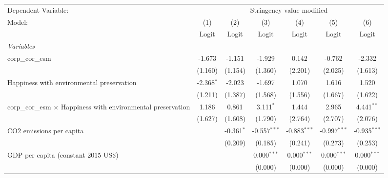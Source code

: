 
\begingroup
\centering
\begin{tabular}{lcccccc}
   \toprule
   Dependent Variable: & \multicolumn{6}{c}{Stringency value modified}\\
   Model:                                                               & (1)          & (2)          & (3)            & (4)            & (5)            & (6)\\  
                                                                        &  Logit       & Logit        & Logit          & Logit          & Logit          & Logit\\  
   \midrule
   \emph{Variables}\\
   corp\_cor\_esm                                                       & -1.673       & -1.151       & -1.929         & 0.142          & -0.762         & -2.332\\   
                                                                        & (1.160)      & (1.154)      & (1.360)        & (2.201)        & (2.025)        & (1.613)\\   
   Happiness with environmental preservation                            & -2.368$^{*}$ & -2.023       & -1.697         & 1.070          & 1.616          & 1.520\\   
                                                                        & (1.211)      & (1.387)      & (1.568)        & (1.556)        & (1.667)        & (1.622)\\   
   corp\_cor\_esm $\times$ Happiness with environmental preservation    & 1.186        & 0.861        & 3.111$^{*}$    & 1.444          & 2.965          & 4.441$^{**}$\\   
                                                                        & (1.627)      & (1.608)      & (1.790)        & (2.764)        & (2.707)        & (2.076)\\   
   CO2 emissions per capita                                             &              & -0.361$^{*}$ & -0.557$^{***}$ & -0.883$^{***}$ & -0.997$^{***}$ & -0.935$^{***}$\\   
                                                                        &              & (0.209)      & (0.185)        & (0.241)        & (0.273)        & (0.253)\\   
   GDP per capita (constant 2015 US\$)                                  &              &              & 0.000$^{***}$  & 0.000$^{***}$  & 0.000$^{***}$  & 0.000$^{***}$\\   
                                                                        &              &              & (0.000)        & (0.000)        & (0.000)        & (0.000)\\   

\end{tabular}
